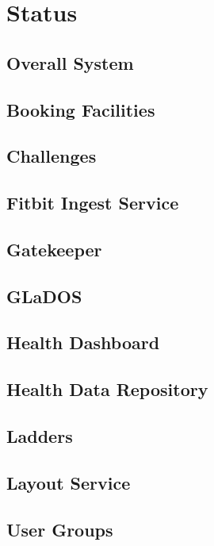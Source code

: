 \chapter{Status}

\section{Overall System}
    

\section{Booking Facilities}
    

\section{Challenges}
    

\section{Fitbit Ingest Service}
    

\section{Gatekeeper}
    

\section{GLaDOS}
    

\section{Health Dashboard}
    

\section{Health Data Repository}
    

\section{Ladders}
    

\section{Layout Service}
    

\section{User Groups}
    